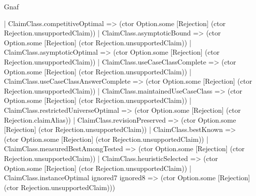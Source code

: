 \begin{lexlean}{Gnaf}
\begin{semanticmodule}
{    | ClaimClass.competitiveOptimal => (ctor Option.some [Rejection] (ctor Rejection.unsupportedClaim))
    | ClaimClass.asymptoticBound => (ctor Option.some [Rejection] (ctor Rejection.unsupportedClaim))
    | ClaimClass.asymptoticOptimal => (ctor Option.some [Rejection] (ctor Rejection.unsupportedClaim))
    | ClaimClass.useCaseClassComplete => (ctor Option.some [Rejection] (ctor Rejection.unsupportedClaim))
    | ClaimClass.useCaseClassAnswerComplete => (ctor Option.some [Rejection] (ctor Rejection.unsupportedClaim))
    | ClaimClass.maintainedUseCaseClass => (ctor Option.some [Rejection] (ctor Rejection.unsupportedClaim))
    | ClaimClass.restrictedUniverseOptimal => (ctor Option.some [Rejection] (ctor Rejection.claimAlias))
    | ClaimClass.revisionPreserved => (ctor Option.some [Rejection] (ctor Rejection.unsupportedClaim))
    | ClaimClass.bestKnown => (ctor Option.some [Rejection] (ctor Rejection.unsupportedClaim))
    | ClaimClass.measuredBestAmongTested => (ctor Option.some [Rejection] (ctor Rejection.unsupportedClaim))
    | ClaimClass.heuristicSelected => (ctor Option.some [Rejection] (ctor Rejection.unsupportedClaim))
    | ClaimClass.instanceOptimal ignored7 ignored8 => (ctor Option.some [Rejection] (ctor Rejection.unsupportedClaim)))
}


\end{semanticmodule}
\end{lexlean}
